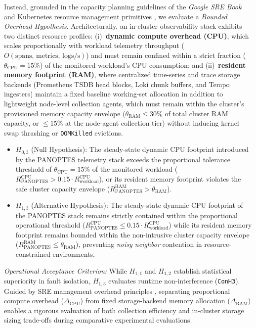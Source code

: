 Instead, grounded in the capacity planning guidelines of the \textit{Google SRE Book} \cite{beyer_2016} and Kubernetes resource management primitives \cite{bernstein_2014}, we evaluate a \textit{Bounded Overhead Hypothesis}. Architecturally, an in-cluster observability stack exhibits two distinct resource profiles: (i)~\textbf{dynamic compute overhead (CPU)}, which scales proportionally with workload telemetry throughput ($O(\text{spans, metrics, logs/s})$) and must remain confined within a strict fraction ($\theta_{\text{CPU}} = 15\%$) of the monitored workload's CPU consumption; and (ii)~\textbf{resident memory footprint (RAM)}, where centralized time-series and trace storage backends (Prometheus TSDB head blocks, Loki chunk buffers, and Tempo ingesters) maintain a fixed baseline working-set allocation in addition to lightweight node-level collection agents, which must remain within the cluster's provisioned memory capacity envelope ($\theta_{\text{RAM}} \le 30\%$ of total cluster RAM capacity, or $\le 15\%$ at the node-agent collection tier) without inducing kernel swap thrashing or \texttt{OOMKilled} evictions.
\begin{itemize}
    \item $H_{0,3}$ (Null Hypothesis): The steady-state dynamic CPU footprint introduced by the PANOPTES telemetry stack exceeds the proportional tolerance threshold of $\theta_{\text{CPU}} = 15\%$ of the monitored workload ($R_{\text{PANOPTES}}^{\text{CPU}} > 0.15 \cdot R_{\text{workload}}^{\text{CPU}}$), or its resident memory footprint violates the safe cluster capacity envelope ($R_{\text{PANOPTES}}^{\text{RAM}} > \theta_{\text{RAM}}$).
    \item $H_{1,3}$ (Alternative Hypothesis): The steady-state dynamic CPU footprint of the PANOPTES stack remains strictly contained within the proportional operational threshold ($R_{\text{PANOPTES}}^{\text{CPU}} \le 0.15 \cdot R_{\text{workload}}^{\text{CPU}}$) while its resident memory footprint remains bounded within the non-intrusive cluster capacity envelope ($R_{\text{PANOPTES}}^{\text{RAM}} \le \theta_{\text{RAM}}$), preventing \textit{noisy neighbor} contention in resource-constrained environments.
\end{itemize}

\textit{Operational Acceptance Criterion:} While $H_{1,1}$ and $H_{1,2}$ establish statistical superiority in fault isolation, $H_{1,3}$ evaluates runtime non-interference (\texttt{ConH3}). Guided by SRE management overhead principles \cite{beyer_2016}, separating proportional compute overhead ($\Delta_{\text{CPU}}$) from fixed storage-backend memory allocation ($\Delta_{\text{RAM}}$) enables a rigorous evaluation of both collection efficiency and in-cluster storage sizing trade-offs during comparative experimental evaluations.
